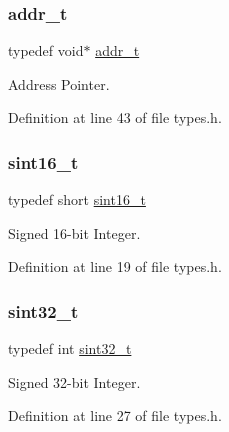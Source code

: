 \subsubsection{\texorpdfstring{addr\+\_\+t}{addr\_t}}
{\footnotesize\ttfamily typedef void$\ast$ \hyperlink{a00035_aa0015d6dd7c46f7b7a2ff7b5bf407f5c_aa0015d6dd7c46f7b7a2ff7b5bf407f5c}{addr\+\_\+t}}



Address Pointer. 



Definition at line 43 of file types.\+h.

\mbox{\label{a00035_a5881659ed80e940350d12831204375cd_a5881659ed80e940350d12831204375cd}} 
\subsubsection{\texorpdfstring{sint16\+\_\+t}{sint16\_t}}
{\footnotesize\ttfamily typedef short \hyperlink{a00035_a5881659ed80e940350d12831204375cd_a5881659ed80e940350d12831204375cd}{sint16\+\_\+t}}



Signed 16-\/bit Integer. 



Definition at line 19 of file types.\+h.

\mbox{\label{a00035_ad838970452fe561cb8e0550cac5336be_ad838970452fe561cb8e0550cac5336be}} 
\subsubsection{\texorpdfstring{sint32\+\_\+t}{sint32\_t}}
{\footnotesize\ttfamily typedef int \hyperlink{a00035_ad838970452fe561cb8e0550cac5336be_ad838970452fe561cb8e0550cac5336be}{sint32\+\_\+t}}



Signed 32-\/bit Integer. 



Definition at line 27 of file types.\+h.

\mbox{\label{a00035_a04761b9e7480e1e48b0d392da17fd5d4_a04761b9e7480e1e48b0d392da17fd5d4}} 

